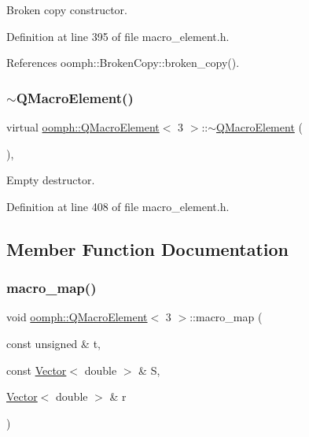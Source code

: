 Broken copy constructor. 



Definition at line 395 of file macro\+\_\+element.\+h.



References oomph\+::\+Broken\+Copy\+::broken\+\_\+copy().

\mbox{\label{classoomph_1_1QMacroElement_3_013_01_4_a61243dc73167dac67eec6c02e6b35d5d}} 
\subsubsection{\texorpdfstring{$\sim$\+Q\+Macro\+Element()}{~QMacroElement()}}
{\footnotesize\ttfamily virtual \hyperlink{classoomph_1_1QMacroElement}{oomph\+::\+Q\+Macro\+Element}$<$ 3 $>$\+::$\sim$\hyperlink{classoomph_1_1QMacroElement}{Q\+Macro\+Element} (\begin{DoxyParamCaption}{ }\end{DoxyParamCaption})\hspace{0.3cm}{\ttfamily [inline]}, {\ttfamily [virtual]}}



Empty destructor. 



Definition at line 408 of file macro\+\_\+element.\+h.



\subsection{Member Function Documentation}
\mbox{\label{classoomph_1_1QMacroElement_3_013_01_4_ae99513e135616e45927307ccfa0f8306}} 
\subsubsection{\texorpdfstring{macro\+\_\+map()}{macro\_map()}}
{\footnotesize\ttfamily void \hyperlink{classoomph_1_1QMacroElement}{oomph\+::\+Q\+Macro\+Element}$<$ 3 $>$\+::macro\+\_\+map (\begin{DoxyParamCaption}\item[{const unsigned \&}]{t,  }\item[{const \hyperlink{classoomph_1_1Vector}{Vector}$<$ double $>$ \&}]{S,  }\item[{\hyperlink{classoomph_1_1Vector}{Vector}$<$ double $>$ \&}]{r }\end{DoxyParamCaption})\hspace{0.3cm}{\ttfamily [virtual]}}



